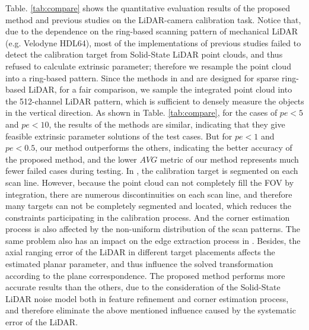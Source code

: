 \documentclass[journal]{vgtc}
\begin{document}
Table. \ref{tab:compare} shows the quantitative evaluation results of the proposed method and previous studies on the LiDAR-camera calibration task. Notice that, due to the dependence on the ring-based scanning pattern of mechanical LiDAR (e.g. Velodyne HDL64), most of the implementations of previous studies failed to detect the calibration target from Solid-State LiDAR point clouds, and thus refused to calculate extrinsic parameter; therefore we resample the point cloud into a ring-based pattern. Since the methods in  \cite{zhou2018automatic} and \cite{wang2017reflectance} are designed for sparse ring-based LiDAR, for a fair comparison, we sample the integrated point cloud into the 512-channel LiDAR pattern, which is sufficient to densely measure the objects in the vertical direction. As shown in Table. \ref{tab:compare},  for the cases of $pe<5$ and $pe<10$, the results of the methods are similar, indicating that they give feasible extrinsic parameter solutions of the test cases. But for $pe<1$ and $ pe<0.5$, our method outperforms the others, indicating the better accuracy of the proposed method, and the lower $AVG$ metric of our method represents much fewer failed cases during testing. In \cite{wang2017reflectance}, the calibration target is segmented on each scan line. However, because the point cloud can not completely fill the FOV by integration, there are numerous discontinuities on each scan line, and therefore many targets can not be completely segmented and located, which reduces the constraints participating in the calibration process. And the corner estimation process is also affected by the non-uniform distribution of the scan patterns. The same problem also has an impact on the edge extraction process in \cite{zhou2018automatic}. Besides, the axial ranging error of the LiDAR in different target placements affects the estimated planar parameter, and thus influence the solved transformation according to the plane correspondence. The proposed method performs more accurate results than the others, due to the consideration of the Solid-State LiDAR noise model both in feature refinement and corner estimation process, and therefore eliminate the above mentioned influence caused by the systematic error of the LiDAR.

\end{document}
